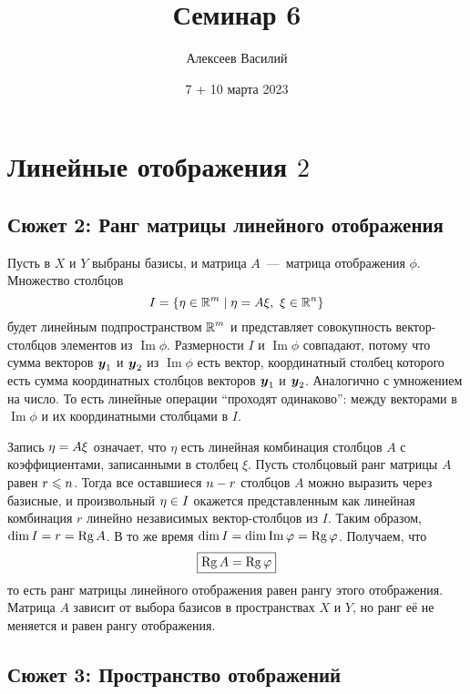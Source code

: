 \documentclass[a4paper,12pt]{article}
\author{Алексеев Василий}
\title{Семинар 6}
\date{7 + 10 марта 2023}
\DeclareMathOperator{\Imag}{Im}
\begin{document}
  \maketitle
  
  \tableofcontents

  \thispagestyle{empty}
  
  \newpage
  


  \section{Линейные отображения $2$}
  
  \subsection{Сюжет 2: Ранг матрицы линейного отображения}
  
  Пусть в $X$ и $Y$ выбраны базисы, и матрица $A$~---~матрица отображения $\phi$.
  Множество столбцов
  \[
    I = \{\eta \in \operatorname{\mathbb R}^m \mid \eta = A \xi,\ \xi \in \operatorname{\mathbb R}^n\}
  \]
  будет линейным подпространством $\operatorname{\mathbb R}^m$ и представляет совокупность вектор-столбцов элементов из $\Imag \phi$.
  Размерности $I$ и $\Imag \phi$ совпадают, потому что сумма векторов $\boldsymbol y_1$ и $\boldsymbol y_2$ из $\Imag \phi$ есть вектор, координатный столбец которого есть сумма координатных столбцов векторов $\boldsymbol y_1$ и $\boldsymbol y_2$.
  Аналогично с умножением на число.
  То есть линейные операции ``проходят одинаково'': между векторами в $\Imag \phi$ и их координатными столбцами в $I$.
  
  Запись $\eta \hm= A \xi$ означает, что $\eta$ есть линейная комбинация столбцов $A$ с коэффициентами, записанными в столбец $\xi$.
  Пусть столбцовый ранг матрицы $A$ равен $r \hm\leq n$.
  Тогда все оставшиеся $n \hm- r$ столбцов $A$ можно выразить через базисные, и произвольный $\eta \hm\in I$ окажется представленным как линейная комбинация $r$ линейно независимых вектор-столбцов из $I$.
  Таким образом, $\dim I \hm= r \hm= \Rg A$.
  В то же время $\dim I \hm= \dim \Imag\phi \hm= \Rg \phi$.
  Получаем, что
  \[
    \boxed{\operatorname{Rg} A = \operatorname{Rg} \varphi}
  \]
  то есть ранг матрицы линейного отображения равен рангу этого отображения.
  Матрица $A$ зависит от выбора базисов в пространствах $X$ и $Y$, но ранг её не меняется и равен рангу отображения.

  
  \subsection{Сюжет 3: Пространство отображений}
  \label{sec:plot2}
  
\end{document}
